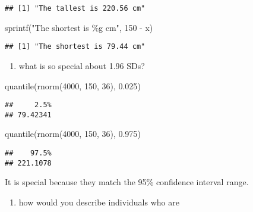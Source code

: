 \documentclass[
]{article}
\newenvironment{Shaded}{\begin{snugshade}}{\end{snugshade}}
\newcommand{\DecValTok}[1]{\textcolor[rgb]{0.00,0.00,0.81}{#1}}
\newcommand{\FloatTok}[1]{\textcolor[rgb]{0.00,0.00,0.81}{#1}}
\newcommand{\FunctionTok}[1]{\textcolor[rgb]{0.00,0.00,0.00}{#1}}
\newcommand{\NormalTok}[1]{#1}
\newcommand{\SpecialCharTok}[1]{\textcolor[rgb]{0.00,0.00,0.00}{#1}}
\newcommand{\StringTok}[1]{\textcolor[rgb]{0.31,0.60,0.02}{#1}}
\providecommand{\tightlist}{%
  \setlength{\itemsep}{0pt}\setlength{\parskip}{0pt}}
\begin{document}
\begin{verbatim}
## [1] "The tallest is 220.56 cm"
\end{verbatim}

\begin{Shaded}
\begin{Highlighting}[]
\FunctionTok{sprintf}\NormalTok{(}\StringTok{"The shortest is \%g cm"}\NormalTok{, }\DecValTok{150} \SpecialCharTok{{-}}\NormalTok{ x)}
\end{Highlighting}
\end{Shaded}

\begin{verbatim}
## [1] "The shortest is 79.44 cm"
\end{verbatim}

\begin{enumerate}
\def\labelenumi{\alph{enumi})}
\setcounter{enumi}{4}
\tightlist
\item
  what is so special about 1.96 SDs?
\end{enumerate}

\begin{Shaded}
\begin{Highlighting}[]
\FunctionTok{quantile}\NormalTok{(}\FunctionTok{rnorm}\NormalTok{(}\DecValTok{4000}\NormalTok{, }\DecValTok{150}\NormalTok{, }\DecValTok{36}\NormalTok{), }\FloatTok{0.025}\NormalTok{)}
\end{Highlighting}
\end{Shaded}

\begin{verbatim}
##     2.5% 
## 79.42341
\end{verbatim}

\begin{Shaded}
\begin{Highlighting}[]
\FunctionTok{quantile}\NormalTok{(}\FunctionTok{rnorm}\NormalTok{(}\DecValTok{4000}\NormalTok{, }\DecValTok{150}\NormalTok{, }\DecValTok{36}\NormalTok{), }\FloatTok{0.975}\NormalTok{)}
\end{Highlighting}
\end{Shaded}

\begin{verbatim}
##    97.5% 
## 221.1078
\end{verbatim}

It is special because they match the 95\% confidence interval range.

\begin{enumerate}
\def\labelenumi{\alph{enumi})}
\setcounter{enumi}{5}
\tightlist
\item
  how would you describe individuals who are
\end{enumerate}
\end{document}
